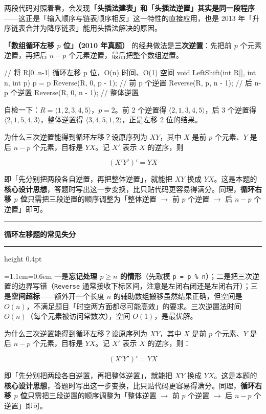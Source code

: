\documentclass[11pt,openany,UTF8]{ctexbook}
\newcommand{\callouthead}[2]{%
  \par\addvspace{7pt}\noindent
  {\color{#1}\rule[-0.15em]{3pt}{1.05em}}\hspace{0.5em}%
  {\bfseries\color{#1}#2}\par\nobreak\vspace{-0.35em}%
  {\color{rulesep}\hrule height 0.4pt}\nobreak\vspace{0.45em}%
  \begingroup\small\setlength{\parindent}{0pt}%
  \leftskip=1.1em\rightskip=0.6em\noindent\ignorespaces}
\newcommand{\calloutend}{\par\endgroup\addvspace{7pt}}
\newenvironment{callwarn}[1]{\callouthead{warnbar}{#1}}{\calloutend}
\begin{document}
两段代码对照着看，会发现\textbf{「头插法建表」和「头插法逆置」其实是同一段程序}——这正是「输入顺序与链表顺序相反」这一特性的直接应用，也是 2013 年「升序链表合并为降序链表」能用头插法解决的原因。

\textbf{「数组循环左移 $p$ 位」（2010 年真题）} 的经典做法是\textbf{三次逆置}：先把前 $p$ 个元素逆置，再把后 $n-p$ 个元素逆置，最后把整个数组逆置。

\begin{codebox}
// 将 R[0..n-1] 循环左移 p 位，O(n) 时间、O(1) 空间
void LeftShift(int R[], int n, int p) {
    p = p %
    Reverse(R, 0, p - 1);    // 前 p 个逆置
    Reverse(R, p, n - 1);    // 后 n-p 个逆置
    Reverse(R, 0, n - 1);    // 整体逆置
}
\end{codebox}

自检一下：$R = \langle 1,2,3,4,5 \rangle$，$p = 2$。前 2 个逆置得 $\langle 2,1,3,4,5 \rangle$，后 3 个逆置得 $\langle 2,1,5,4,3 \rangle$，整体逆置得 $\langle 3,4,5,1,2 \rangle$，正是左移 2 位的结果。

为什么三次逆置能得到循环左移？设原序列为 $X Y$，其中 $X$ 是前 $p$ 个元素、$Y$ 是后 $n-p$ 个元素，目标是 $Y X$。记 $X'$ 表示 $X$ 的逆序，则

\[(X'Y')' = Y X\]

即「先分别把两段各自逆置，再把整体逆置」，就能把 $XY$ 换成 $YX$。这是本题的\textbf{核心设计思想}，答题时写出这一步变换，比只贴代码更容易得满分。同理，\textbf{循环右移 $p$ 位}只需把三段逆置的顺序调整为「整体逆置 $\to$ 前 $p$ 个逆置 $\to$ 后 $n-p$ 个逆置」即可。

\begin{callwarn}{循环左移题的常见失分}
一是\textbf{忘记处理 $p \ge n$ 的情形}（先取模 \texttt{p =\allowbreak{} p \% n}）；二是把三次逆置的边界写错（\texttt{Reverse} 通常接收下标区间，注意是左闭右闭还是左闭右开）；三是\textbf{空间超标}——额外开一个长度 $n$ 的辅助数组搬移虽然结果正确，但空间是 $O(n)$，不满足题目「时空两方面都尽可能高效」的要求。三次逆置法时间 $O(n)$（每个元素被访问常数次），空间 $O(1)$，是最优解。

\end{callwarn}

为什么三次逆置能得到循环左移？设原序列为 $X Y$，其中 $X$ 是前 $p$ 个元素、$Y$ 是后 $n-p$ 个元素，目标是 $Y X$。记 $X'$ 表示 $X$ 的逆序，则：

\[(X'Y')' = Y X\]

即「先分别把两段各自逆置，再把整体逆置」，就能把 $XY$ 换成 $YX$。这是本题的\textbf{核心设计思想}，答题时写出这一步变换，比只贴代码更容易得满分。同理，\textbf{循环右移 $p$ 位}只需把三段逆置的顺序调整为「整体逆置 $\to$ 前 $p$ 个逆置 $\to$ 后 $n-p$ 个逆置」即可。
\end{document}
